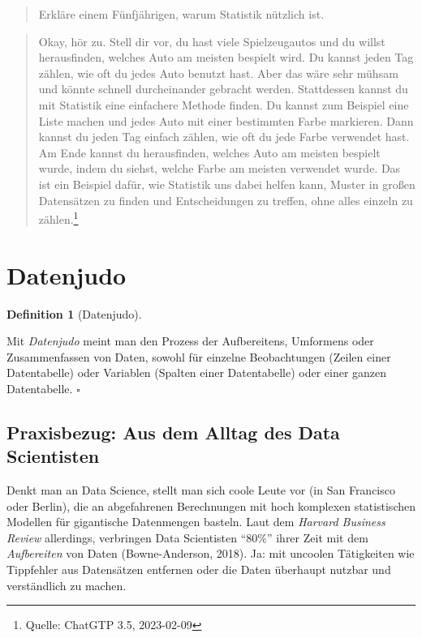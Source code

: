 \documentclass[
  letterpaper,
]{scrbook}
\theoremstyle{definition}
\theoremstyle{definition}
\theoremstyle{definition}
\newtheorem{definition}{Definition}[chapter]
\theoremstyle{remark}
\begin{document}
\begin{quote}
{} Erkläre einem Fünfjährigen, warum Statistik nützlich
ist.
\end{quote}

\begin{quote}
{} Okay, hör zu. Stell dir vor, du hast viele
Spielzeugautos und du willst herausfinden, welches Auto am meisten
bespielt wird. Du kannst jeden Tag zählen, wie oft du jedes Auto benutzt
hast. Aber das wäre sehr mühsam und könnte schnell durcheinander
gebracht werden. Stattdessen kannst du mit Statistik eine einfachere
Methode finden. Du kannst zum Beispiel eine Liste machen und jedes Auto
mit einer bestimmten Farbe markieren. Dann kannst du jeden Tag einfach
zählen, wie oft du jede Farbe verwendet hast. Am Ende kannst du
herausfinden, welches Auto am meisten bespielt wurde, indem du siehst,
welche Farbe am meisten verwendet wurde. Das ist ein Beispiel dafür, wie
Statistik uns dabei helfen kann, Muster in großen Datensätzen zu finden
und Entscheidungen zu treffen, ohne alles einzeln zu zählen.\footnote{Quelle:
  ChatGTP 3.5, 2023-02-09}
\end{quote}

\section{Datenjudo}\label{datenjudo}

\begin{definition}[Datenjudo]\protect\hypertarget{def-datenjudo}{}\label{def-datenjudo}

Mit \emph{Datenjudo} meint man den Prozess der Aufbereitens, Umformens
oder Zusammenfassen von Daten, sowohl für einzelne Beobachtungen (Zeilen
einer Datentabelle) oder Variablen (Spalten einer Datentabelle) oder
einer ganzen Datentabelle. \(\square\)

\end{definition}

\subsection{Praxisbezug: Aus dem Alltag des Data
Scientisten}\label{praxisbezug-aus-dem-alltag-des-data-scientisten}

Denkt man an Data Science, stellt man sich coole Leute vor (in San
Francisco oder Berlin), die an abgefahrenen Berechnungen mit hoch
komplexen statistischen Modellen für gigantische Datenmengen basteln.
Laut dem \emph{Harvard Business Review} allerdings, verbringen Data
Scientisten \enquote{80\%} ihrer Zeit mit dem \emph{Aufbereiten} von
Daten (Bowne-Anderson, 2018). Ja: mit uncoolen Tätigkeiten wie
Tippfehler aus Datensätzen entfernen oder die Daten überhaupt nutzbar
und verständlich zu machen.
\end{document}
